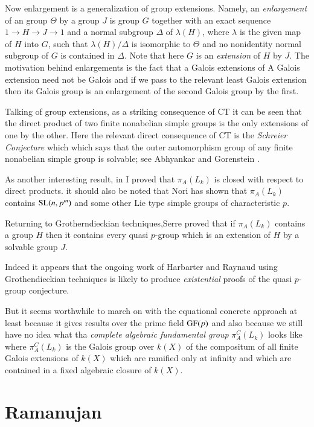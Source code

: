 Now enlargement is a generalization of group extensions. Namely, an \textit{enlargement} of an group $\Theta$ by a group $J$ is group $G$ together with an exact sequence $1 \rightarrow H \rightarrow J \rightarrow 1 $ and a normal subgroup $\Delta$ of $\lambda(H)$, where $\lambda$ is the given map of $H$ into $G$, such that $\lambda(H)/\Delta$ is isomorphic to  $\Theta$ and no nonidentity normal subgroup of $G$ is contained in $\Delta$. Note that here $G$ is an \textit{extension} of $H$ by $J$. The motivation behind enlargements is the fact that a Galois extensions of A Galois extension need not be Galois and if we pass to the relevant least Galois extension then its Galois group is an enlargement of the second Galois group by the first.

Talking of group extensions, as a striking consequence of CT it can be seen that the direct product of two finite nonabelian simple groups is the only extensions of one by the other. Here the relevant direct consequence of CT is the \textit{Schreier Conjecture} which which says that the outer automorphism group of any finite nonabelian simple group is solvable; see Abhyankar \cite{art1-key11} and Gorenstein \cite{art1-key32}.

As another interesting result, in \cite{art1-key12} I proved that $\pi_{A}(L_{k})$ is closed with respect to direct products. it should also be noted that Nori \cite{art1-key49} has shown that $\pi_{A}(L_{k})$ contains $\operatorname{SL}(n,p^m)$ and some other Lie type simple groups of characteristic $p$.

Returning to Grotherndieckian techniques,Serre \cite{art1-key56} proved that if $\pi_{A}(L_{k})$ contains a group $H$ then it contains every quasi $p$-group which is an extension of $H$ by a solvable group $J$. 

Indeed it appears that the ongoing work of Harbarter and Raynaud using Grothendieckian techniques is likely to produce \textit{existential} proofs of the quasi $p$-group conjecture.

But it seems worthwhile to march on with the equational concrete approach at least because it gives results over the prime field $\operatorname{GF}(p)$ and also because we still have no idea what tha \textit{complete algebraic fundamental group} $\pi^{C}_{A}(L_{k})$ looks like where $\pi^{C}_{A}(L_{k})$ is the Galois group over $k(X)$ of the compositum of all finite Galois extensions of $k(X)$ which are ramified only at infinity and which are contained in a fixed algebraic closure of $k(X)$. 

\section{Ramanujan}

